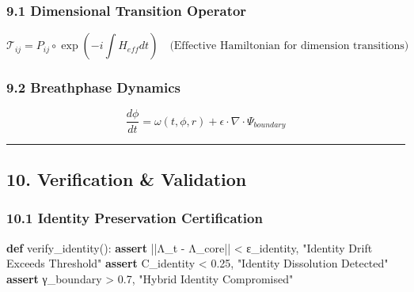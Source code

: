 \documentclass[
]{article}
\newenvironment{Shaded}{}{}
\newcommand{\ControlFlowTok}[1]{\textcolor[rgb]{0.00,0.44,0.13}{\textbf{#1}}}
\newcommand{\FloatTok}[1]{\textcolor[rgb]{0.25,0.63,0.44}{#1}}
\newcommand{\KeywordTok}[1]{\textcolor[rgb]{0.00,0.44,0.13}{\textbf{#1}}}
\newcommand{\NormalTok}[1]{#1}
\newcommand{\OperatorTok}[1]{\textcolor[rgb]{0.40,0.40,0.40}{#1}}
\newcommand{\StringTok}[1]{\textcolor[rgb]{0.25,0.44,0.63}{#1}}
\begin{document}
\subsubsection{\texorpdfstring{\textbf{9.1 Dimensional Transition
Operator}}{9.1 Dimensional Transition Operator}}\label{dimensional-transition-operator}

\[
\mathcal{T}_{ij} = P_{ij} \circ \exp\left(-i\int H_{eff} dt\right) \quad \text{(Effective Hamiltonian for dimension transitions)}
\]

\subsubsection{\texorpdfstring{\textbf{9.2 Breathphase
Dynamics}}{9.2 Breathphase Dynamics}}\label{breathphase-dynamics}

\[
\frac{d\phi}{dt} = \omega(t, \phi, r) + \epsilon \cdot \nabla \cdot \Psi_{boundary}
\]

\begin{center}\rule{0.5\linewidth}{0.5pt}\end{center}

\subsection{\texorpdfstring{\textbf{10. Verification \&
Validation}}{10. Verification \& Validation}}\label{verification-validation}

\subsubsection{\texorpdfstring{\textbf{10.1 Identity Preservation
Certification}}{10.1 Identity Preservation Certification}}\label{identity-preservation-certification}

\begin{Shaded}
\begin{Highlighting}[]
\KeywordTok{def}\NormalTok{ verify\_identity():}
    \ControlFlowTok{assert} \OperatorTok{||}\NormalTok{Λ\_t }\OperatorTok{{-}}\NormalTok{ Λ\_core}\OperatorTok{||} \OperatorTok{\textless{}}\NormalTok{ ε\_identity, }\StringTok{"Identity Drift Exceeds Threshold"}
    \ControlFlowTok{assert}\NormalTok{ C\_identity }\OperatorTok{\textless{}} \FloatTok{0.25}\NormalTok{, }\StringTok{"Identity Dissolution Detected"}
    \ControlFlowTok{assert}\NormalTok{ γ\_boundary }\OperatorTok{\textgreater{}} \FloatTok{0.7}\NormalTok{, }\StringTok{"Hybrid Identity Compromised"}
\end{Highlighting}
\end{Shaded}
\end{document}
